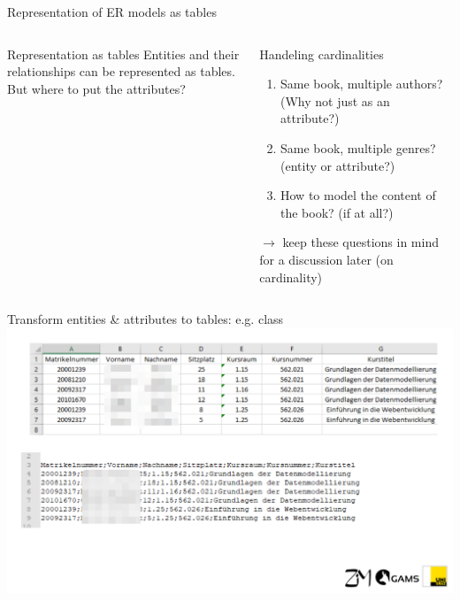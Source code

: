 \begin{frame}{Representation of ER models as tables}
  \begin{columns}[T,onlytextwidth]
    \footnotesize
    \begin{block}{Representation as tables}
    Entities and their relationships can be represented as tables. \\
    But where to put the attributes? 
    
    \end{block}


      \begin{exampleblock}{Handeling cardinalities}
      \begin{enumerate}\small
          \item Same book, multiple authors? (Why not just as an attribute?) 
          \item Same book, multiple genres? (entity or attribute?) 
          \item How to model the content of the book? (if at all?)
      \end{enumerate} \small
      $\to$ keep these questions in mind for a discussion later (on cardinality)
      \end{exampleblock}

  \end{columns}
\end{frame}

\begin{frame}{Transform entities \& attributes to tables: e.g. class}
    \includegraphics[width=\textwidth]{img/wdh-studierende-csv.png}
\end{frame}


